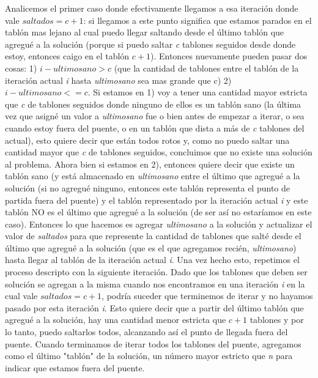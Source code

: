 \documentclass{article}
\begin{document}
\newline Analicemos el primer caso donde efectivamente llegamos a esa iteraci\'on donde vale \textit{$saltados = c + 1$}: si llegamos a este punto significa que estamos parados en el tabl\'on mas lejano al cual puedo llegar saltando desde el \'ultimo tabl\'on que agregu\'e a la soluci\'on (porque si puedo saltar \textit{c} tablones seguidos desde donde estoy, entonces caigo en el tabl\'on \textit{$c + 1$}). Entonces nuevamente pueden pasar dos cosas: 1) \textit{$i - ultimosano > c$} (que la cantidad de tablones entre el tabl\'on de la iteraci\'on actual \textit{i} hasta \textit{ultimosano} sea mas grande que c) 2) \textit{$i - ultimosano <= c$}. Si estamos en 1) voy a tener una cantidad mayor estricta que \textit{c} de tablones seguidos donde ninguno de ellos es un tabl\'on sano (la \'ultima vez que asign\'e un valor a \textit{ultimosano} fue o bien antes de empezar a iterar, o sea cuando estoy fuera del puente, o en un tabl\'on que dista a m\'as de \textit{c} tablones del actual), esto quiere decir que est\'an todos rotos y, como no puedo saltar una cantidad mayor que \textit{c} de tablones seguidos, concluimos que no existe una soluci\'on al problema. Ahora bien si estamos en 2), entonces quiere decir que existe un tabl\'on sano (y est\'a almacenado en \textit{ultimosano} entre el \'ultimo que agregu\'e a la soluci\'on  (si no agregu\'e ninguno, entonces este tabl\'on representa el punto de partida fuera del puente) y el tabl\'on representado por la iteraci\'on actual \textit{i} y este tabl\'on NO es el \'ultimo que agregu\'e a la soluci\'on (de ser as\'i no estar\'iamos en este caso). Entonces lo que hacemos es agregar \textit{ultimosano} a la soluci\'on y actualizar el valor de \textit{saltados} para que represente la cantidad de tablones que salt\'e desde el \'ultimo que agregu\'e a la soluci\'on (que es el que agregamos reci\'en, \textit{ultimosano}) hasta llegar al tabl\'on de la iteraci\'on actual \textit{i}. Una vez hecho esto, repetimos el proceso descripto con la siguiente iteraci\'on.
\newline
Dado que los tablones que deben ser soluci\'on se agregan a la misma cuando nos encontramos en una iteraci\'on \textit{i} en la cual vale \textit{$saltados = c + 1$}, podr\'ia suceder que terminemos de iterar y no hayamos pasado por esta iteraci\'on \textit{i}. Esto quiere decir que a partir del \'ultimo tabl\'on que agregu\'e a la soluci\'on, hay una cantidad menor estricta que \textit{$c + 1$} tablones y por lo tanto, puedo saltarlos todos, alcanzando as\'i el punto de llegada fuera del puente.
\newline Cuando terminamos de iterar todos los tablones del puente, agregamos como el \'ultimo "tabl\'on" de la soluci\'on, un n\'umero mayor estricto que \textit{n} para indicar que estamos fuera del puente. 
\end{document}
